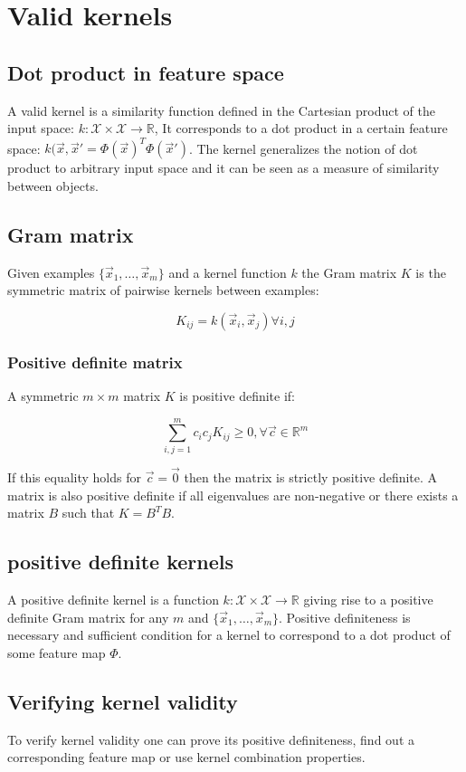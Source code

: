 \section{Valid kernels}

	\subsection{Dot product in feature space}
	A valid kernel is a similarity function defined in the Cartesian product of the input space: $k:\mathcal{X}\times\mathcal{X}\rightarrow\mathbb{R}$,
	It corresponds to a dot product in a certain feature space: $k(\vec{x},\vec{x}'=\Phi(\vec{x})^T\Phi(\vec{x}')$.
	The kernel generalizes the notion of dot product to arbitrary input space and it can be seen as a measure of similarity between objects.

	\subsection{Gram matrix}
	Given examples $\{\vec{x}_1,\dots,\vec{x}_m\}$ and a kernel function $k$ the Gram matrix $K$ is the symmetric matrix of pairwise kernels between examples:

	$$K_{ij} = k(\vec{x}_i,\vec{x}_j)\forall i,j$$

		\subsubsection{Positive definite matrix}
		A symmetric $m\times m$ matrix $K$ is positive definite if:

		$$\sum\limits_{i,j=1}^mc_ic_jK_{ij}\ge0,\forall\vec{c}\in\mathbb{R}^m$$

		If this equality holds for $\vec{c}=\vec{0}$ then the matrix is strictly positive definite.
		A matrix is also positive definite if all eigenvalues are non-negative or there exists a matrix $B$ such that $K=B^TB$.

	\subsection{positive definite kernels}
	A positive definite kernel is a function $k:\mathcal{X}\times\mathcal{X}\rightarrow\mathbb{R}$ giving rise to a positive definite Gram matrix for any $m$ and $\{\vec{x}_1,\dots,\vec{x}_m\}$.
	Positive definiteness is necessary and sufficient condition for a kernel to correspond to a dot product of some feature map $\Phi$.

	\subsection{Verifying kernel validity}
	To verify kernel validity one can prove its positive definiteness, find out a corresponding feature map or use kernel combination properties.

